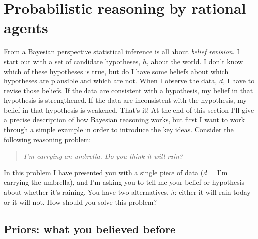 \documentclass[
  a4paper,
]{book}
\begin{document}
\hypertarget{probabilistic-reasoning-by-rational-agents}{%
\section{Probabilistic reasoning by rational
agents}\label{probabilistic-reasoning-by-rational-agents}}

From a Bayesian perspective statistical inference is all about
\emph{belief revision}. I start out with a set of candidate hypotheses,
\(h\), about the world. I don't know which of these hypotheses is true,
but do I have some beliefs about which hypotheses are plausible and
which are not. When I observe the data, \(d\), I have to revise those
beliefs. If the data are consistent with a hypothesis, my belief in that
hypothesis is strengthened. If the data are inconsistent with the
hypothesis, my belief in that hypothesis is weakened. That's it! At the
end of this section I'll give a precise description of how Bayesian
reasoning works, but first I want to work through a simple example in
order to introduce the key ideas. Consider the following reasoning
problem:

\begin{quote}
\emph{I'm carrying an umbrella. Do you think it will rain?}
\end{quote}

In this problem I have presented you with a single piece of data (\(d\)
= I'm carrying the umbrella), and I'm asking you to tell me your belief
or hypothesis about whether it's raining. You have two alternatives,
\(h\): either it will rain today or it will not. How should you solve
this problem?

\hypertarget{priors-what-you-believed-before}{%
\subsection{Priors: what you believed
before}\label{priors-what-you-believed-before}}
\end{document}
